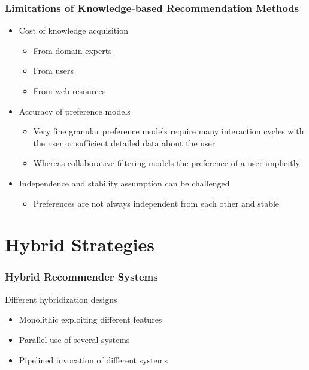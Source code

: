 \documentclass{beamer}
\begin{document}
\begin{frame}
    \frametitle{Limitations of Knowledge-based Recommendation Methods}
    \begin{itemize}
    \item Cost of knowledge acquisition
        \begin{itemize}
        \item From domain experts
        \item From users
        \item From web resources
        \end{itemize}
    \item Accuracy of preference models
        \begin{itemize}
        \item Very fine granular preference models require many interaction
            cycles with the user or sufficient detailed data about the user
        \item Whereas collaborative filtering models the preference of a user
            implicitly
        \end{itemize}
    \item Independence and stability assumption can be challenged
        \begin{itemize}
        \item Preferences are not always independent from each other and stable
        \end{itemize}
    \end{itemize}
\end{frame}

\section{Hybrid Strategies}

\begin{frame}
    \frametitle{Hybrid Recommender Systems}
    Different hybridization designs 
    \begin{itemize}
    \item Monolithic exploiting different features
    \item Parallel use of several systems
    \item Pipelined invocation of different systems
    \end{itemize}
\end{frame}
\end{document}
